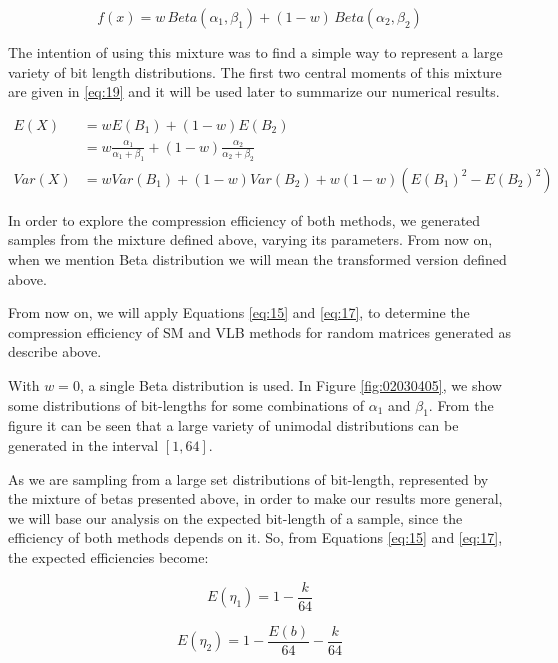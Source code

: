 \documentclass[10pt]{article}
\begin{document}
\begin{equation}\label{eq:18}
 f(x) =  w \, Beta(\alpha_1,\beta_1) + (1-w)\,Beta(\alpha_2,\beta_2)
\end{equation}

The intention of using this mixture was to find a simple way to represent a 
large variety of bit length distributions. The first two central moments of this 
mixture are given in \ref{eq:19} and it will be used later to summarize our 
numerical results.

\begin{align}\label{eq:19}
 E(X) &= w E(B_1) + (1-w) E(B_2) \nonumber \\
 &= w \frac{\alpha_1}{\alpha_1+\beta_1} + (1-w)\frac{\alpha_2}{\alpha_2+\beta_2}\nonumber \\
 Var(X) &= w Var(B_1) + (1-w) Var(B_2) + w (1-w) (E(B_1)^2 - E(B_2)^2)
\end{align}

In order to explore the compression efficiency of both methods, we generated 
samples from the mixture defined above, varying its parameters. From now on, 
when we mention Beta distribution we will mean the transformed version defined 
above. 

From now on, we will apply Equations \ref{eq:15} and \ref{eq:17}, to determine 
the compression efficiency of SM and VLB methods for random matrices generated 
as describe above. 

With $w=0$, a single Beta distribution is used. In Figure \ref{fig:02030405}, 
we show some distributions of bit-lengths for some combinations of $\alpha_1$ 
and $\beta_1$. From the figure it can be seen that a large variety of unimodal 
distributions can be generated in the interval $[1,64]$. 

As we are sampling from a large set distributions of bit-length, represented by 
the mixture of betas presented above, in order to make our results more general, 
we will base our analysis on the expected bit-length of a sample, since the 
efficiency of both methods depends on it. So, from Equations \ref{eq:15} and 
\ref{eq:17}, the expected efficiencies become:
 
\begin{equation}\label{eq:20}
 E(\eta_1) = 1 - \frac{k}{64}
\end{equation}

\begin{equation}\label{eq:21}
 E(\eta_2) = 1 - \frac{E(b)}{64} - \frac{k}{64}
\end{equation}
\end{document}
